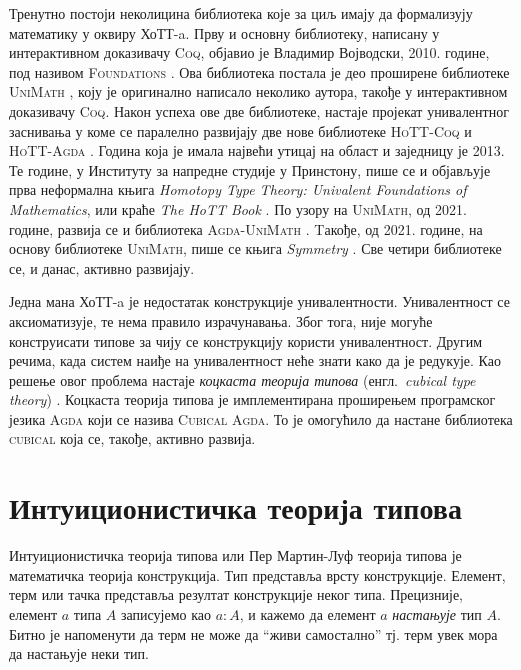 \documentclass[12pt,oneside]{memoir}
\begin{document}
Тренутно постоји неколицина библиотека које за циљ имају да формализују математику у оквиру ХоТТ-a. Прву и основну библиотеку, написану у интерактивном доказивачу \textsc{Coq}, објавио је Владимир Војводски, 2010. године, под називом \textsc{Foundations} \cite{vlad_found}. Ова библиотека постала је део проширене библиотеке \textsc{UniMath} \cite{unimath}, коју је оригинално написало неколико аутора, такође у интерактивном доказивачу \textsc{Coq}. Након успеха ове две библиотеке, настаје пројекат унивалентног заснивања у коме се паралелно развијају две нове библиотеке \textsc{HoTT-Coq} \cite{hottcoq} и \textsc{HoTT-Agda} \cite{hottagda}. Година која је имала највећи утицај на област и заједницу је 2013. Те године, у Институту за напредне студије у Принстону, пише се и објављује прва неформална књига \emph{Homotopy Type Theory: Univalent Foundations of Mathematics}, или краће \emph{The HoTT Book} \cite{hottbook}. По узору на \textsc{UniMath}, од 2021. године, развија се и библиотека \textsc{Agda-UniMath} \cite{agda-unimath}. Tакође, од 2021. године, на основу библиотеке \textsc{UniMath}, пише се књига \emph{Symmetry} \cite{symm}. Све четири библиотеке се, и данас, активно развијају.

Једна мана ХоТТ-a је недостатак конструкције унивалентности. Унивалентност се аксиоматизује, те нема правило израчунавања. Због тога, није могуће конструисати типове за чију се конструкцију користи унивалентност. Другим речима, када систем наиђе на унивалентност неће знати како да је редукује. Као решење овог проблема настаје \emph{коцкаста теорија типова} (енгл.~\emph{cubical type theory}) \cite{cube}. Коцкаста теорија типова је имплементирана проширењем програмског језика \textsc{Agda} који се назива \textsc{Cubical Agda}. То је омогућило да настане библиотека \textsc{cubical} \cite{cubi} која се, такође, активно развија.

\chapter{Интуиционистичка теорија типова}
\label{cha:int}

Интуиционистичка теорија типова или Пер Мартин-Луф теорија типова је математичка теорија конструкција. Тип представља врсту конструкције. Елемент, терм или тачка представља резултат конструкције неког типа. Прецизније, елемент $a$ типа $A$ записујемо као $a : A$, и кажемо да елемент $a$ \emph{настањује} тип $A$. Битно је напоменути да терм не може да ``живи самостално'' тј. терм увек мора да настањује неки тип. 
\end{document}
